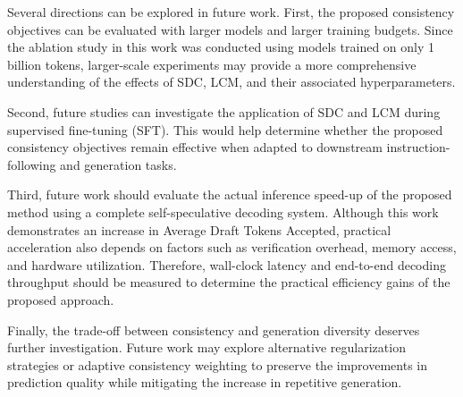 Several directions can be explored in future work. First, the proposed
consistency objectives can be evaluated with larger models and larger
training budgets. Since the ablation study in this work was conducted
using models trained on only 1 billion tokens, larger-scale experiments
may provide a more comprehensive understanding of the effects of SDC,
LCM, and their associated hyperparameters.

Second, future studies can investigate the application of SDC and LCM
during supervised fine-tuning (SFT). This would help determine whether
the proposed consistency objectives remain effective when adapted to
downstream instruction-following and generation tasks.

Third, future work should evaluate the actual inference speed-up of the
proposed method using a complete self-speculative decoding system.
Although this work demonstrates an increase in Average Draft Tokens
Accepted, practical acceleration also depends on factors such as
verification overhead, memory access, and hardware utilization.
Therefore, wall-clock latency and end-to-end decoding throughput should
be measured to determine the practical efficiency gains of the proposed
approach.

Finally, the trade-off between consistency and generation diversity
deserves further investigation. Future work may explore alternative
regularization strategies or adaptive consistency weighting to preserve
the improvements in prediction quality while mitigating the increase
in repetitive generation.
